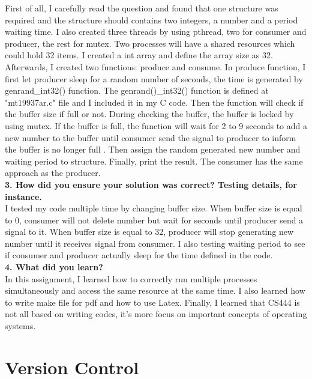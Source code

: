 \documentclass[10pt,letterpaper,titlepage]{article}
\begin{document}
First of all, I carefully read the question and found that one structure was required and the structure should contains two integers, a number and a period waiting time. I also created three threads by using pthread, two for consumer and producer, the rest for mutex. Two processes will have a shared resources which could hold 32 items. I created a int array and define the array size as 32. Afterwards, I created two functions: produce and consume. In produce function, I first let producer sleep for a random number of seconds, the time is generated by genrand\_int32() function. The genrand()\_int32() function is defined at "mt19937ar.c" file and I included it in my C code. Then the function will check if the buffer size if full or not. During checking the buffer, the buffer is locked  by using mutex. If the buffer is full, the function will wait for 2 to 9 seconds to add a new number to the buffer until consumer send the signal to producer to inform the buffer is no longer full . Then assign the random generated new number and waiting period to structure. Finally, print the result. The consumer has the same approach as the producer.\\

\textbf{3. How did you ensure your solution was correct? Testing details, for instance.}\\

I tested my code multiple time by changing buffer size. When buffer size is equal to 0, consumer will not delete number but wait for seconds until producer send a signal to it. When buffer size is equal to 32, producer will stop generating new number until it receives signal from consumer. I also testing waiting period to see if consumer and producer actually sleep for the time defined in the code.\\

\textbf{4. What did you learn?}\\

In this assignment, I learned how to correctly run multiple processes simultaneously and access the same resource at the same time. I also learned how to write make file for pdf and how to use Latex. Finally, I learned that CS444 is not all based on writing codes, it's more focus on important concepts of operating systems.


\section{Version Control}

\begin{versionhistory}


\end{versionhistory}
\end{document}
